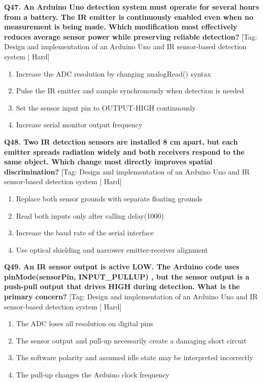 \noindent\textbf{Q47. An Arduino Uno detection system must operate for several hours from a battery. The IR emitter is continuously enabled even when no measurement is being made. Which modification most effectively reduces average sensor power while preserving reliable detection?} \hfill [Tag: Design and implementation of an Arduino Uno and IR sensor-based detection system | Hard]
\begin{enumerate}[label=(\alph*),topsep=2pt,itemsep=1pt,partopsep=0pt,parsep=0pt]
    \item {Increase the ADC resolution by changing analogRead() syntax}
    \item {Pulse the IR emitter and sample synchronously when detection is needed}
    \item {Set the sensor input pin to OUTPUT-HIGH continuously}
    \item {Increase serial monitor output frequency}
\end{enumerate}
\vspace{2mm}

\noindent\textbf{Q48. Two IR detection sensors are installed 8 cm apart, but each emitter spreads radiation widely and both receivers respond to the same object. Which change most directly improves spatial discrimination?} \hfill [Tag: Design and implementation of an Arduino Uno and IR sensor-based detection system | Hard]
\begin{enumerate}[label=(\alph*),topsep=2pt,itemsep=1pt,partopsep=0pt,parsep=0pt]
    \item {Replace both sensor grounds with separate floating grounds}
    \item {Read both inputs only after calling delay(1000)}
    \item {Increase the baud rate of the serial interface}
    \item {Use optical shielding and narrower emitter-receiver alignment}
\end{enumerate}
\vspace{2mm}

\noindent\textbf{Q49. An IR sensor output is active LOW. The Arduino code uses pinMode(sensorPin, INPUT\_PULLUP) , but the sensor output is a push-pull output that drives HIGH during detection. What is the primary concern?} \hfill [Tag: Design and implementation of an Arduino Uno and IR sensor-based detection system | Hard]
\begin{enumerate}[label=(\alph*),topsep=2pt,itemsep=1pt,partopsep=0pt,parsep=0pt]
    \item {The ADC loses all resolution on digital pins}
    \item {The sensor output and pull-up necessarily create a damaging short circuit}
    \item {The software polarity and assumed idle state may be interpreted incorrectly}
    \item {The pull-up changes the Arduino clock frequency}
\end{enumerate}
\vspace{2mm}

